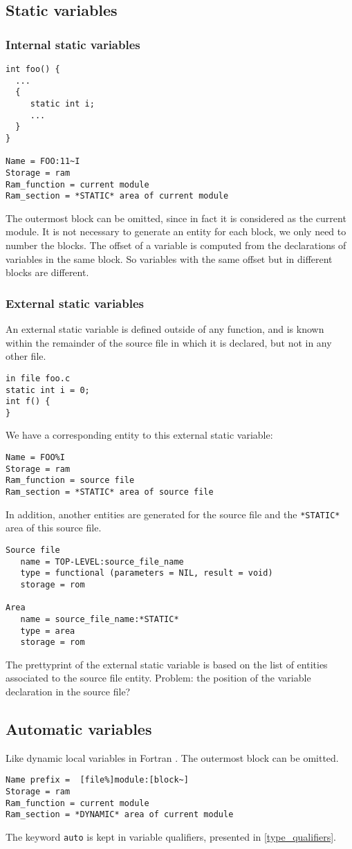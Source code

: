 \documentclass[a4paper]{article}
\begin{document}
\subsection{Static variables}
\subsubsection{Internal static variables}
\begin{verbatim}
int foo() {
  ...
  {
     static int i;
     ...
  } 
}

Name = FOO:11~I
Storage = ram 
Ram_function = current module
Ram_section = *STATIC* area of current module
\end{verbatim}
The outermost block can be omitted, since in fact it is considered as 
the current module. It is not necessary to generate an entity for each block, 
we only need to number the blocks. The offset of a variable is computed from 
the declarations of variables in the same block. So variables with the same
offset but in different blocks are different. 
\subsubsection{External static variables}
An external static variable is defined outside of any function, and is
known within the remainder of the source file in which it is declared, but
not in any other file. 
\begin{verbatim}
in file foo.c
static int i = 0; 
int f() {
}
\end{verbatim}
We have a corresponding entity to this external static variable:
\begin{verbatim}
Name = FOO%I
Storage = ram 
Ram_function = source file  
Ram_section = *STATIC* area of source file 
\end{verbatim}
In addition, another entities are generated for the source file and the 
\texttt{*STATIC*} area of this source file.
\begin{verbatim}
Source file
   name = TOP-LEVEL:source_file_name
   type = functional (parameters = NIL, result = void)
   storage = rom

Area
   name = source_file_name:*STATIC*
   type = area
   storage = rom
\end{verbatim}
 The prettyprint of the external static variable is based on the list of
entities associated to the source file entity. Problem: the position of the 
variable declaration in the source file? 
\subsection{Automatic variables}
Like dynamic local variables in Fortran \cite{Coel01}. 
The outermost block can be omitted. 
\begin{verbatim}
Name prefix =  [file%]module:[block~]
Storage = ram 
Ram_function = current module 
Ram_section = *DYNAMIC* area of current module
\end{verbatim}
The keyword \verb/auto/ is kept in variable qualifiers, presented in
\ref{type_qualifiers}. 
\end{document}
